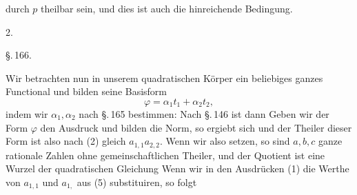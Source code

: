 durch $p$ theilbar sein, und dies ist auch die hinreichende Bedingung.

2. 

\begin{center}
\S.\,166.

\end{center}

Wir betrachten nun in unserem quadratischen K\"orper ein beliebiges ganzes Functional und bilden seine Basisform
\[
\varphi = \alpha_1 t_1 + \alpha_2 t_2,
\]
indem wir $\alpha_1, \alpha_2$ nach \S.\,165 bestimmen:
Nach \S.\,146 ist dann
Geben wir der Form $\varphi$ den Ausdruck
und bilden die Norm, so ergiebt sich
und der Theiler dieser Form ist also nach (2) gleich $a_{1,1}a_{2,2}$.
Wenn wir also
setzen, so sind $a, b, c$ ganze rationale Zahlen ohne gemeinschaftlichen Theiler, und der Quotient
ist eine Wurzel der quadratischen Gleichung
Wenn wir in den Ausdr\"ucken (1) die Werthe von $a_{1,1}$ und $a_{1,}$ aus (5) substituiren, so folgt
